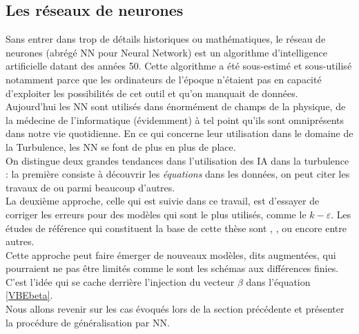 \documentclass[a4paper,12pt]{article}
\newcommand{\keps}{$k-\varepsilon$}
\newcommand\bk{\color{black}}
\newcommand\brick{\color{brick}}
\numberwithin{equation}{section} %
\begin{document}
\brick \subsection{Les réseaux de neurones} \bk
\noindent Sans entrer dans trop de détails historiques ou mathématiques, le réseau de neurones (abrégé NN pour Neural Network) est un algorithme d'intelligence artificielle datant des années 50. Cette algorithme a été sous-estimé et sous-utilisé notamment parce que les ordinateurs de l'époque n'étaient pas en capacité d'exploiter les possibilités de cet outil et qu'on manquait de données.\\
Aujourd'hui les NN sont utilisés dans énormément de champs de la physique, de la médecine de l'informatique (évidemment) à tel point qu'ils sont omniprésents dans notre vie quotidienne. En ce qui concerne leur utilisation dans le domaine de la Turbulence, les NN se font de plus en plus de place. \\
On distingue deux grandes tendances dans l'utilisation des IA dans la turbulence : la première consiste à découvrir les \textit{équations} dans les données, on peut citer les travaux de \citep{kutz2017deep} ou \citep{raissi2018hidden} parmi beaucoup d'autres. \\
La deuxième approche, celle qui est suivie dans ce travail, est d'essayer de corriger les erreurs pour des modèles qui sont le plus utilisés, comme le \keps $ $. Les études de référence qui constituent la base de cette thèse sont \citep{parish2016paradigm}, \citep{singh2017machine}, \citep{wu2018data} ou encore \citep{wang2017physics} entre autres. \\

\noindent Cette approche peut faire émerger de nouveaux modèles, dits augmentées, qui pourraient ne pas être limités comme le sont les schémas aux différences finies. C'est l'idée qui se cache derrière l'injection du vecteur $\beta$ dans l'équation \eqref{VBEbeta}.\\
\noindent Nous allons revenir sur les cas évoqués lors de la section précédente et présenter la procédure de généralisation par NN.
\end{document}
